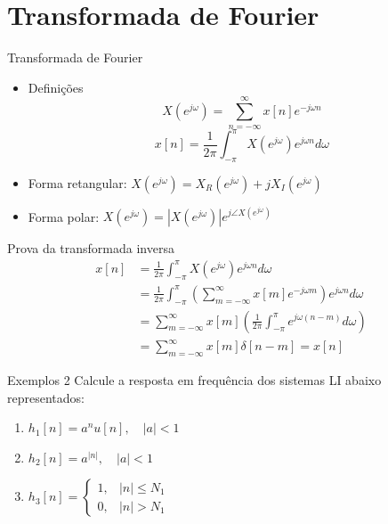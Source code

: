 \section[slide=true]{Transformada de Fourier}
\begin{slide}[toc=]{Transformada de Fourier}
 \begin{itemize}
  \item Defini\c c\~oes
     \begin{equation*} X(e^{j\omega})=\sum_{n=-\infty}^{\infty} x[n]e^{-j\omega n}  \end{equation*}
     \begin{equation*} x[n]=\frac{1}{2\pi}\int_{-\pi}^{\pi} X(e^{j\omega})e^{j\omega n} d\omega \end{equation*}
   \item Forma retangular: $X(e^{j\omega}) = X_R(e^{j\omega}) + j X_I(e^{j\omega})$
   \item Forma polar: $X(e^{j\omega}) = |X(e^{j\omega})|e^{j\angle X(e^{j\omega})}$
 \end{itemize}
\end{slide}

\begin{slide}[toc=]{Prova da transformada inversa}
      \begin{align*} x[n]&= \frac{1}{2\pi}\int_{-\pi}^{\pi} X(e^{j\omega})e^{j\omega n} d\omega\\
                       &= \frac{1}{2\pi}\int_{-\pi}^{\pi} \left ( \sum_{m=-\infty}^{\infty} x[m]e^{-j\omega m}\right )e^{j\omega n} d\omega\\
                       & = \sum_{m=-\infty}^{\infty}x[m]\left ( \frac{1}{2\pi} \int_{-\pi}^{\pi} e^{j\omega(n-m)}d\omega \right ) \\   
                       & = \sum_{m=-\infty}^{\infty}x[m] \delta[n-m] = x[n]\end{align*}
\end{slide}

\begin{slide}[toc=]{Exemplos 2}
Calcule a resposta em frequência dos sistemas LI abaixo representados:
\begin{enumerate}
   \item $h_1[n] = a^nu[n], \quad |a|<1$
   \item $h_2[n] = a^{|n|}, \quad |a|<1$
   \item $h_3[n] = \begin{cases} 1,& |n|\leq N_1\\0,&|n|> N_1\end{cases}$
\end{enumerate}
\end{slide}

